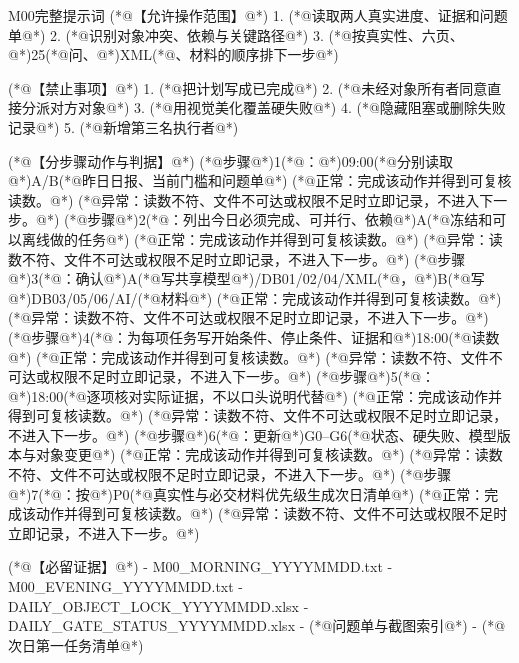 \documentclass[UTF8,openany,zihao=-4]{ctexbook}
\renewcommand{\_}{\textunderscore\allowbreak}
\begin{document}
\begin{PromptBox}{M00完整提示词}
(*@{\promptcjk 【允许操作范围】}@*)
1. (*@{\promptcjk 读取两人真实进度、证据和问题单}@*)
2. (*@{\promptcjk 识别对象冲突、依赖与关键路径}@*)
3. (*@{\promptcjk 按真实性、六页、}@*)25(*@{\promptcjk 问、}@*)XML(*@{\promptcjk 、材料的顺序排下一步}@*)

(*@{\promptcjk 【禁止事项】}@*)
1. (*@{\promptcjk 把计划写成已完成}@*)
2. (*@{\promptcjk 未经对象所有者同意直接分派对方对象}@*)
3. (*@{\promptcjk 用视觉美化覆盖硬失败}@*)
4. (*@{\promptcjk 隐藏阻塞或删除失败记录}@*)
5. (*@{\promptcjk 新增第三名执行者}@*)

(*@{\promptcjk 【分步骤动作与判据】}@*)
(*@{\promptcjk 步骤}@*)1(*@{\promptcjk ：}@*)09:00(*@{\promptcjk 分别读取}@*)A/B(*@{\promptcjk 昨日日报、当前门槛和问题单}@*)
  (*@{\promptcjk 正常：完成该动作并得到可复核读数。}@*)
  (*@{\promptcjk 异常：读数不符、文件不可达或权限不足时立即记录，不进入下一步。}@*)
(*@{\promptcjk 步骤}@*)2(*@{\promptcjk ：列出今日必须完成、可并行、依赖}@*)A(*@{\promptcjk 冻结和可以离线做的任务}@*)
  (*@{\promptcjk 正常：完成该动作并得到可复核读数。}@*)
  (*@{\promptcjk 异常：读数不符、文件不可达或权限不足时立即记录，不进入下一步。}@*)
(*@{\promptcjk 步骤}@*)3(*@{\promptcjk ：确认}@*)A(*@{\promptcjk 写共享模型}@*)/DB01/02/04/XML(*@{\promptcjk ，}@*)B(*@{\promptcjk 写}@*)DB03/05/06/AI/(*@{\promptcjk 材料}@*)
  (*@{\promptcjk 正常：完成该动作并得到可复核读数。}@*)
  (*@{\promptcjk 异常：读数不符、文件不可达或权限不足时立即记录，不进入下一步。}@*)
(*@{\promptcjk 步骤}@*)4(*@{\promptcjk ：为每项任务写开始条件、停止条件、证据和}@*)18:00(*@{\promptcjk 读数}@*)
  (*@{\promptcjk 正常：完成该动作并得到可复核读数。}@*)
  (*@{\promptcjk 异常：读数不符、文件不可达或权限不足时立即记录，不进入下一步。}@*)
(*@{\promptcjk 步骤}@*)5(*@{\promptcjk ：}@*)18:00(*@{\promptcjk 逐项核对实际证据，不以口头说明代替}@*)
  (*@{\promptcjk 正常：完成该动作并得到可复核读数。}@*)
  (*@{\promptcjk 异常：读数不符、文件不可达或权限不足时立即记录，不进入下一步。}@*)
(*@{\promptcjk 步骤}@*)6(*@{\promptcjk ：更新}@*)G0--G6(*@{\promptcjk 状态、硬失败、模型版本与对象变更}@*)
  (*@{\promptcjk 正常：完成该动作并得到可复核读数。}@*)
  (*@{\promptcjk 异常：读数不符、文件不可达或权限不足时立即记录，不进入下一步。}@*)
(*@{\promptcjk 步骤}@*)7(*@{\promptcjk ：按}@*)P0(*@{\promptcjk 真实性与必交材料优先级生成次日清单}@*)
  (*@{\promptcjk 正常：完成该动作并得到可复核读数。}@*)
  (*@{\promptcjk 异常：读数不符、文件不可达或权限不足时立即记录，不进入下一步。}@*)

(*@{\promptcjk 【必留证据】}@*)
- M00_MORNING_YYYYMMDD.txt
- M00_EVENING_YYYYMMDD.txt
- DAILY_OBJECT_LOCK_YYYYMMDD.xlsx
- DAILY_GATE_STATUS_YYYYMMDD.xlsx
- (*@{\promptcjk 问题单与截图索引}@*)
- (*@{\promptcjk 次日第一任务清单}@*)


\end{PromptBox}
\end{document}
